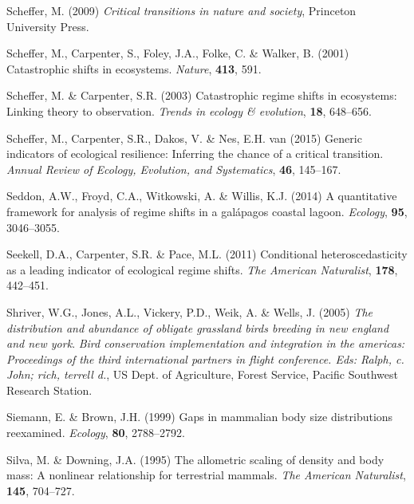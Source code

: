 \documentclass[12pt,twoside,openany]{reedthesis}
\begin{document}
\leavevmode\hypertarget{ref-scheffer_critical_2009}{}%
Scheffer, M. (2009) \emph{Critical transitions in nature and society}, Princeton University Press.

\leavevmode\hypertarget{ref-scheffer_catastrophic_2001}{}%
Scheffer, M., Carpenter, S., Foley, J.A., Folke, C. \& Walker, B. (2001) Catastrophic shifts in ecosystems. \emph{Nature}, \textbf{413}, 591.

\leavevmode\hypertarget{ref-scheffer2003catastrophic}{}%
Scheffer, M. \& Carpenter, S.R. (2003) Catastrophic regime shifts in ecosystems: Linking theory to observation. \emph{Trends in ecology \& evolution}, \textbf{18}, 648--656.

\leavevmode\hypertarget{ref-scheffer2015generic}{}%
Scheffer, M., Carpenter, S.R., Dakos, V. \& Nes, E.H. van (2015) Generic indicators of ecological resilience: Inferring the chance of a critical transition. \emph{Annual Review of Ecology, Evolution, and Systematics}, \textbf{46}, 145--167.

\leavevmode\hypertarget{ref-seddon2014quantitative}{}%
Seddon, A.W., Froyd, C.A., Witkowski, A. \& Willis, K.J. (2014) A quantitative framework for analysis of regime shifts in a galápagos coastal lagoon. \emph{Ecology}, \textbf{95}, 3046--3055.

\leavevmode\hypertarget{ref-seekell2011conditional}{}%
Seekell, D.A., Carpenter, S.R. \& Pace, M.L. (2011) Conditional heteroscedasticity as a leading indicator of ecological regime shifts. \emph{The American Naturalist}, \textbf{178}, 442--451.

\leavevmode\hypertarget{ref-shriver2005distribution}{}%
Shriver, W.G., Jones, A.L., Vickery, P.D., Weik, A. \& Wells, J. (2005) \emph{The distribution and abundance of obligate grassland birds breeding in new england and new york}. \emph{Bird conservation implementation and integration in the americas: Proceedings of the third international partners in flight conference. Eds: Ralph, c. John; rich, terrell d.}, US Dept. of Agriculture, Forest Service, Pacific Southwest Research Station.

\leavevmode\hypertarget{ref-siemann1999gaps}{}%
Siemann, E. \& Brown, J.H. (1999) Gaps in mammalian body size distributions reexamined. \emph{Ecology}, \textbf{80}, 2788--2792.

\leavevmode\hypertarget{ref-silva1995allometric}{}%
Silva, M. \& Downing, J.A. (1995) The allometric scaling of density and body mass: A nonlinear relationship for terrestrial mammals. \emph{The American Naturalist}, \textbf{145}, 704--727.
\end{document}
